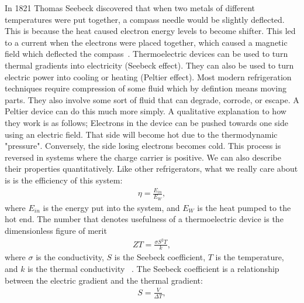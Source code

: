 	In 1821 Thomas Seebeck discovered that when two metals of different temperatures were put together, a compass needle would be slightly deflected. This is because the heat caused electron energy levels to become shifter. This led to a current when the electrons were placed together, which caused a magnetic field which deflected the compass~\cite{Dommelen13}. Thermoelectric devices can be used to turn thermal gradients into electricity (Seebeck effect). They can also be used to turn electric power into cooling or heating (Peltier effect). Most modern refrigeration techniques require compression of some fluid which by defintion means moving parts. They also involve some sort of fluid that can degrade, corrode, or escape. A Peltier device can do this much more simply. A qualitative explanation to how they work is as follows; Electrons in the device can be pushed towards one side using an electric field. That side will become hot due to the thermodynamic "pressure". Conversely, the side losing electrons becomes cold. This process is reversed in systems where the charge carrier is positive. We can also describe their properties quantitatively. Like other refrigerators, what we really care about is is the efficiency of this system:
\begin{eqnarray}
\eta = \frac{E_{in}}{E_{W}},
\label{efficiency}
\end{eqnarray}
where $E_{in}$ is the energy put into the system, and $E_{W}$ is the heat pumped to the hot end. The number that denotes usefulness of a thermoelectric device is the dimensionless figure of merit
\begin{eqnarray}
ZT = \frac{\sigma S^2 T}{k},
\label{ZT}
\end{eqnarray}
where $\sigma$ is the conductivity, $S$ is the Seebeck coefficient, $T$ is the temperature, and $k$ is the thermal conductivity ~\cite{chen}. The Seebeck coefficient is a relationship between the electric gradient and the thermal gradient:
\begin{eqnarray}
S = \frac{V}{\Delta T},
\label{Seebeck}
\end{eqnarray}

